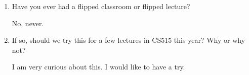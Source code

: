 \documentclass{article}
\begin{document}
\begin{enumerate}%
\item Have you ever had a flipped classroom or flipped lecture?

No, never. 

\item If so, should we try this for a few lectures in CS515 this year? Why or why not?

I am very curious about this. I would like to have a try. 


\end{enumerate}
\end{document}
